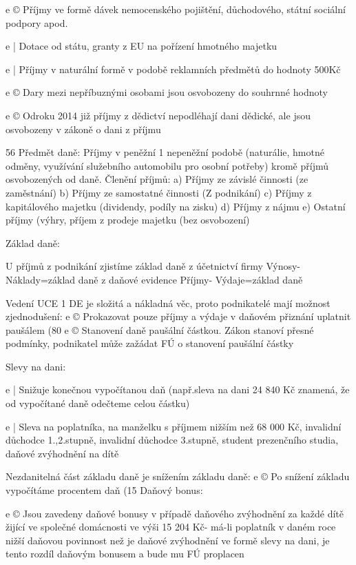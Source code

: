 e © Příjmy ve formě dávek nemocenského pojištění, důchodového, státní sociální podpory
apod.

e | Dotace od státu, granty z EU na pořízení hmotného majetku

e | Příjmy v naturální formě v podobě reklamních předmětů do hodnoty 500Kč

e © Dary mezi nepříbuznými osobami jsou osvobozeny do souhrnné hodnoty

e © Odroku 2014 již příjmy z dědictví nepodléhají dani dědické, ale jsou osvobozeny
v zákoně o dani z příjmu

56
\newpage
Předmět daně:
Příjmy v peněžní 1 nepeněžní podobě (naturálie, hmotné odměny, využívání služebního
automobilu pro osobní potřeby) kromě příjmů osvobozených od daně.
Členění příjmů:
a) Příjmy ze závislé činnosti (ze zaměstnání)
b) Příjmy ze samostatné činnosti (Z podnikání)
c) Příjmy z kapitálového majetku (dividendy, podíly na zisku)
d) Příjmy z nájmu
e) Ostatní příjmy (výhry, příjem z prodeje majetku (bez osvobození)







Základ daně:

U příjmů z podnikání zjistíme základ daně
z účetnictví firmy Výnosy-Náklady=základ daně
z daňové evidence Příjmy- Výdaje=základ daně





Vedení UCE 1 DE je složitá a nákladná věc, proto podnikatelé mají možnost zjednodušení:
e © Prokazovat pouze příjmy a výdaje v daňovém přiznání uplatnit paušálem
(80%
e © Stanovení daně paušální částkou. Zákon stanoví přesné podmínky, podnikatel může
zažádat FÚ o stanovení paušální částky

Slevy na dani:

e | Snižuje konečnou vypočítanou daň (např.sleva na dani 24 840 Kč znamená, že od
vypočítané daně odečteme celou částku)

e | Sleva na poplatníka, na manželku s příjmem nižším než 68 000 Kč, invalidní
důchodce 1.,2.stupně, invalidní důchodce 3.stupně, student prezenčního studia,
daňové zvýhodnění na dítě

Nezdanitelná část základu daně je snížením základu daně:
e © Po snížení základu vypočítáme procentem daň (15%
Daňový bonus:

e © Jsou zavedeny daňové bonusy v případě daňového zvýhodnění za každé dítě žijící ve
společné domácnosti ve výši 15 204 Kč- má-li poplatník v daném roce nižší daňovou
povinnost než je daňové zvýhodnění ve formě slevy na dani, je tento rozdíl daňovým
bonusem a bude mu FÚ proplacen

